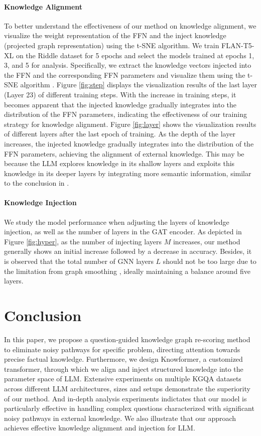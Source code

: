\documentclass[11pt]{article}
\begin{document}
\paragraph{Knowledge Alignment}
To better understand the effectiveness of our method on knowledge alignment, we visualize the weight representation of the FFN and the inject knowledge (projected graph representation) using the t-SNE algorithm.
We train FLAN-T5-XL on the Riddle dataset for 5 epochs and select the models trained at epochs 1, 3, and 5 for analysis.
Specifically, we extract the knowledge vectors injected into the FFN and the corresponding FFN parameters and visualize them using the t-SNE algorithm \cite{t_sne}. 
Figure \ref{fig:step} displays the visualization results of the last layer (Layer 23) of different training steps. 
With the increase in training steps, it becomes apparent that the injected knowledge gradually integrates into the distribution of the FFN parameters, indicating the effectiveness of our training strategy for knowledge alignment.
Figure \ref{fig:layer} shows the visualization results of different layers after the last epoch of training. 
As the depth of the layer increases, the injected knowledge gradually integrates into the distribution of the FFN parameters, achieving the alignment of external knowledge. 
This may be because the LLM explores knowledge in its shallow layers and exploits this knowledge in its deeper layers by integrating more semantic information, similar to the conclusion in \cite{rome}.

\paragraph{Knowledge Injection}
We study the model performance when adjusting the layers of knowledge injection, as well as the number of layers in the GAT encoder.
As depicted in Figure \ref{fig:hyper}, as the number of injecting layers $M$ increases, our method generally shows an initial increase followed by a decrease in accuracy. Besides, it is observed that the total number of GNN layers $L$ should not be too large due to the limitation from graph smoothing \cite{smoothing}, ideally maintaining a balance around five layers. 



\section{Conclusion}
In this paper, we propose a question-guided knowledge graph re-scoring method to eliminate noisy pathways for specific problem, directing attention towards precise factual knowledge. Furthermore, we design Knowformer, a customized transformer, through which we align and inject structured knowledge into the parameter space of LLM. Extensive experiments on multiple KGQA datasets across different LLM architectures, sizes and setups demonstrate the superiority of our method. And in-depth analysis experiments indictates that our model is particularly effective in handling complex questions characterized with significant noisy pathways in external knowledge. We also illustrate that our approach achieves effective knowledge alignment and injection for LLM.
\end{document}
